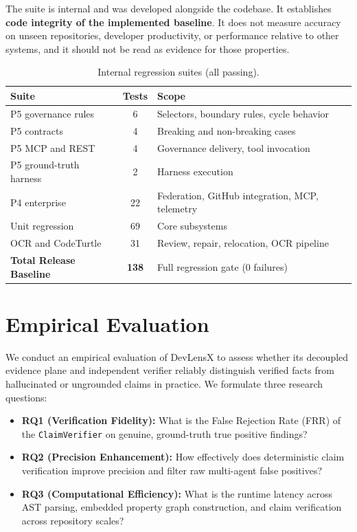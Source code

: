 \documentclass[runningheads]{llncs}
\begin{document}
The suite is internal and was developed alongside the codebase. It establishes \textbf{code integrity of the implemented baseline}. It does not measure accuracy on unseen repositories, developer productivity, or performance relative to other systems, and it should not be read as evidence for those properties.

\begin{table}[t]
\centering
\caption{Internal regression suites (all passing).}
\label{tab:regression}
\begin{tabular}{lcp{6.5cm}}
\toprule
\textbf{Suite} & \textbf{Tests} & \textbf{Scope} \\
\midrule
P5 governance rules & 6 & Selectors, boundary rules, cycle behavior \\
P5 contracts & 4 & Breaking and non-breaking cases \\
P5 MCP and REST & 4 & Governance delivery, tool invocation \\
P5 ground-truth harness & 2 & Harness execution \\
P4 enterprise & 22 & Federation, GitHub integration, MCP, telemetry \\
Unit regression & 69 & Core subsystems \\
OCR and CodeTurtle & 31 & Review, repair, relocation, OCR pipeline \\
\midrule
\textbf{Total Release Baseline} & \textbf{138} & Full regression gate (0 failures) \\
\bottomrule
\end{tabular}
\end{table}

\section{Empirical Evaluation}
\label{sec:evaluation}
We conduct an empirical evaluation of DevLensX to assess whether its decoupled evidence plane and independent verifier reliably distinguish verified facts from hallucinated or ungrounded claims in practice. We formulate three research questions:
\begin{itemize}
    \item \textbf{RQ1 (Verification Fidelity):} What is the False Rejection Rate (FRR) of the \texttt{ClaimVerifier} on genuine, ground-truth true positive findings?
    \item \textbf{RQ2 (Precision Enhancement):} How effectively does deterministic claim verification improve precision and filter raw multi-agent false positives?
    \item \textbf{RQ3 (Computational Efficiency):} What is the runtime latency across AST parsing, embedded property graph construction, and claim verification across repository scales?
\end{itemize}
\end{document}
